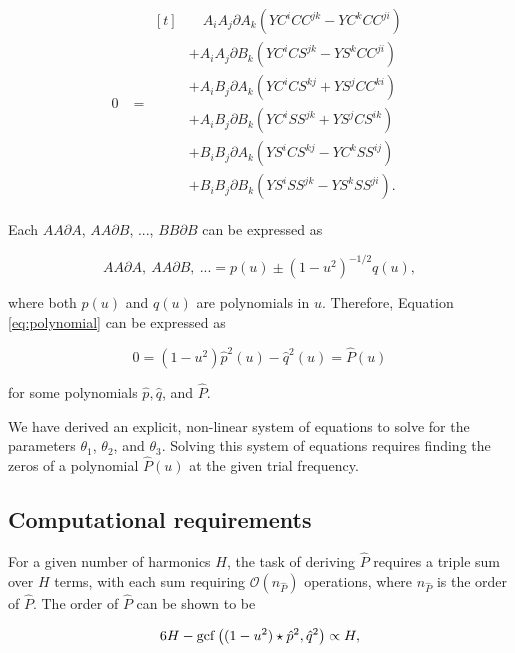 \documentclass[iop]{emulateapj}
\newcommand{\bigO}{\mathcal{O}}
\newcommand{\dA}{\partial A}
\newcommand{\dB}{\partial B}
\begin{document}
\begin{align}\label{eq:polynomial}
0 &= 
\begin{aligned}[t]
&\quad A_iA_j\dA_k\left(YC^iCC^{jk} -  YC^kCC^{ji}\right)\\
&+ A_iA_j\dB_k\left(YC^iCS^{jk} - YS^kCC^{ji}\right)\\
&+ A_iB_j\dA_k\left(YC^iCS^{kj} + YS^jCC^{ki}\right)\\
&+ A_iB_j\dB_k\left(YC^iSS^{jk} + YS^jCS^{ik}\right)\\
&+ B_iB_j\dA_k\left(YS^iCS^{kj} - YC^kSS^{ij}\right)\\
&+ B_iB_j\dB_k\left(YS^iSS^{jk} - YS^kSS^{ji}\right).
\end{aligned}
\end{align}

Each $AA\dA$, $AA\dB$, ..., $BB\dB$ can be expressed as 

\begin{equation}
AA\dA,~AA\dB,~...= p(u) \pm (1 - u^2)^{-1/2}q(u),
\end{equation}

\noindent where both $p(u)$ and $q(u)$ are polynomials in $u$. Therefore, Equation
\ref{eq:polynomial} can be expressed as

\begin{equation}
0 = (1 - u^2)\hat{p}^2(u) - \hat{q}^2(u) = \hat{P}(u)
\end{equation}

\noindent for some polynomials $\hat{p}, \hat{q}$, and $\hat{P}$.


We have derived an explicit, non-linear system of equations to solve for
the parameters $\theta_1$, $\theta_2$, and $\theta_3$. Solving this system of equations
requires finding the zeros of a polynomial $\hat{P}(u)$ at the given trial frequency.

\subsection{Computational requirements}

For a given number of harmonics $H$, the task of deriving 
$\hat{P}$ requires a triple sum over $H$ terms, with each sum
requiring $\bigO(n_{\hat{P}})$ operations, where $n_{\hat{P}}$ is the order
of $\hat{P}$. The order of $\hat{P}$ can be shown to be

\begin{equation}
6H - {\rm gcf}\left((1 - u^2)\star\hat{p}^2, \hat{q}^2\right) \propto H,
\end{equation}
\end{document}
